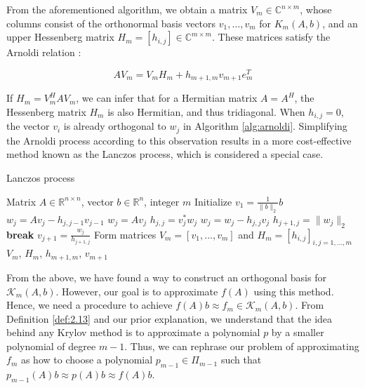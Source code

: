 From the aforementioned algorithm, we obtain a matrix $V_m \in \mathbb{C}^{n \times m}$, whose columns consist of the orthonormal basis vectors $v_1, \ldots, v_m$ for $K_m(A, b)$, and an upper Hessenberg matrix $H_m = [h_{i,j}] \in \mathbb{C}^{m \times m}$. These matrices satisfy the Arnoldi relation \cite{38}:

\begin{equation}
    AV_m = V_m H_m + h_{m+1,m} v_{m+1} e_m^T
    \label{eq:2.25}
\end{equation}

If \( H_m = V_m^H A V_m \), we can infer that for a Hermitian matrix \( A = A^H \), the Hessenberg matrix \( H_m \) is also Hermitian, and thus tridiagonal. When \( h_{i,j} = 0 \), the vector \( v_i \) is already orthogonal to \( w_j \) in Algorithm \ref{alg:arnoldi}. Simplifying the Arnoldi process according to this observation results in a more cost-effective method known as the Lanczos process, which is considered a special case.

\begin{algorithm}[H]
\caption{Lanczos process \cite{38}}
\label{alg:lanczos}
\begin{algorithmic}[1] %
\REQUIRE Matrix $A \in \mathbb{R}^{n \times n}$, vector $b \in \mathbb{R}^n$, integer $m$
\STATE Initialize $v_1 = \frac{1}{\|b\|_2} b$
        \STATE $w_j = A v_j - h_{j,j-1} v_{j-1}$
    \ELSE
        \STATE $w_j = A v_j$
    \ENDIF
    \STATE $h_{j,j} = v_j^* w_j$
    \STATE $w_j = w_j - h_{j,j} v_j$
    \STATE $h_{j+1,j} = \|w_j\|_2$
        \STATE \textbf{break}
    \ENDIF
    \STATE $v_{j+1} = \frac{w_j}{h_{j+1,j}}$
\ENDFOR
\STATE Form matrices $V_m = [v_1, \ldots, v_m]$ and $H_m = [h_{i,j}]_{i,j=1,\ldots,m}$
\RETURN $V_m$, $H_m$, $h_{m+1,m}$, $v_{m+1}$
\end{algorithmic}
\end{algorithm}

From the above, we have found a way to construct an orthogonal basis for $\mathcal{K}_m(A, b)$. However, our goal is to approximate $f(A)$ using this method. Hence, we need a procedure to achieve $f(A)b \approx f_m \in \mathcal{K}_m(A,b)$. From Definition \ref{def:2.13} and our prior explanation, we understand that the idea behind any Krylov method is to approximate a polynomial $p$ by a smaller polynomial of degree $m-1$. Thus, we can rephrase our problem of approximating $f_m$ as how to choose a polynomial $p_{m-1} \in \Pi_{m-1}$ such that $p_{m-1}(A)b \approx p(A)b \approx f(A)b$.

